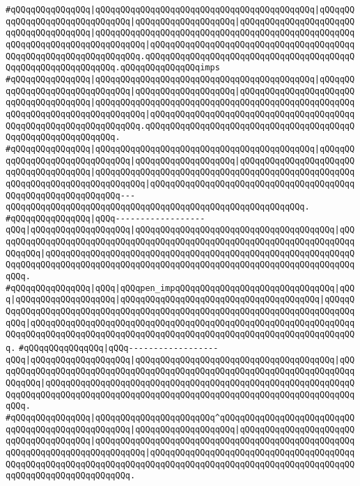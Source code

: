\verb|#qQQqqQQqqQQqqQQq|\verb#|qQQqqQQqqQQqqQQqqQQqqQQqqQQqqQQqqQQqqQQqqQQq|qQQqqQQqqQQqqQQqqQQqqQQqqQQqqQQq|qQQqqQQqqQQqqQQqqQQq|qQQqqQQqqQQqqQQqqQQqqQQqqQQqqQQqqQQqqQQq|qQQqqQQqqQQqqQQqqQQqqQQqqQQqqQQqqQQqqQQqqQQqqQQqqQQqqQQqqQQqqQQqqQQqqQQqqQQqqQQq|qQQqqQQqqQQqqQQqqQQqqQQqqQQqqQQqqQQqqQQqqQQqqQQqqQQqqQQqqQQqqQQqqQQq.qQQqqQQqqQQqqQQqqQQqqQQqqQQqqQQqqQQqqQQqqQQqqQQqqQQqqQQqqQQqqQQq.qQQqqQQqqQQqqQQqimps#\newline
\verb|#qQQqqQQqqQQqqQQq|\verb#|qQQqqQQqqQQqqQQqqQQqqQQqqQQqqQQqqQQqqQQqqQQq|qQQqqQQqqQQqqQQqqQQqqQQqqQQqqQQq|qQQqqQQqqQQqqQQqqQQq|qQQqqQQqqQQqqQQqqQQqqQQqqQQqqQQqqQQqqQQq|qQQqqQQqqQQqqQQqqQQqqQQqqQQqqQQqqQQqqQQqqQQqqQQqqQQqqQQqqQQqqQQqqQQqqQQqqQQqqQQq|qQQqqQQqqQQqqQQqqQQqqQQqqQQqqQQqqQQqqQQqqQQqqQQqqQQqqQQqqQQqqQQqqQQq.qQQqqQQqqQQqqQQqqQQqqQQqqQQqqQQqqQQqqQQqqQQqqQQqqQQqqQQqqQQqqQQq.#\newline
\verb|#qQQqqQQqqQQqqQQq|\verb#|qQQqqQQqqQQqqQQqqQQqqQQqqQQqqQQqqQQqqQQqqQQq|qQQqqQQqqQQqqQQqqQQqqQQqqQQqqQQq|qQQqqQQqqQQqqQQqqQQq|qQQqqQQqqQQqqQQqqQQqqQQqqQQqqQQqqQQqqQQq|qQQqqQQqqQQqqQQqqQQqqQQqqQQqqQQqqQQqqQQqqQQqqQQqqQQqqQQqqQQqqQQqqQQqqQQqqQQqqQQq|qQQqqQQqqQQqqQQqqQQqqQQqqQQqqQQqqQQqqQQqqQQqqQQqqQQqqQQqqQQqqQQq---qQQqqQQqqQQqqQQqqQQqqQQqqQQqqQQqqQQqqQQqqQQqqQQqqQQqqQQqqQQq.#\newline
\verb|#qQQqqQQqqQQqqQQq|\verb#|qQQq------------------qQQq|qQQqqQQqqQQqqQQqqQQq|qQQqqQQqqQQqqQQqqQQqqQQqqQQqqQQqqQQqqQQq|qQQqqQQqqQQqqQQqqQQqqQQqqQQqqQQqqQQqqQQqqQQqqQQqqQQqqQQqqQQqqQQqqQQqqQQqqQQqqQQq|qQQqqQQqqQQqqQQqqQQqqQQqqQQqqQQqqQQqqQQqqQQqqQQqqQQqqQQqqQQqqQQqqQQqqQQqqQQqqQQqqQQqqQQqqQQqqQQqqQQqqQQqqQQqqQQqqQQqqQQqqQQqqQQqqQQqqQQq.#\newline
\verb|#qQQqqQQqqQQqqQQq|\verb#|qQQq|qQQqpen_impqQQqqQQqqQQqqQQqqQQqqQQqqQQqqQQq|qQQq|qQQqqQQqqQQqqQQqqQQq|qQQqqQQqqQQqqQQqqQQqqQQqqQQqqQQqqQQqqQQq|qQQqqQQqqQQqqQQqqQQqqQQqqQQqqQQqqQQqqQQqqQQqqQQqqQQqqQQqqQQqqQQqqQQqqQQqqQQqqQQq|qQQqqQQqqQQqqQQqqQQqqQQqqQQqqQQqqQQqqQQqqQQqqQQqqQQqqQQqqQQqqQQqqQQqqQQqqQQqqQQqqQQqqQQqqQQqqQQqqQQqqQQqqQQqqQQqqQQqqQQqqQQqqQQqqQQqqQQq.#\newline
\verb|#qQQqqQQqqQQqqQQq|\verb#|qQQq------------------qQQq|qQQqqQQqqQQqqQQqqQQq|qQQqqQQqqQQqqQQqqQQqqQQqqQQqqQQqqQQqqQQq|qQQqqQQqqQQqqQQqqQQqqQQqqQQqqQQqqQQqqQQqqQQqqQQqqQQqqQQqqQQqqQQqqQQqqQQqqQQqqQQq|qQQqqQQqqQQqqQQqqQQqqQQqqQQqqQQqqQQqqQQqqQQqqQQqqQQqqQQqqQQqqQQqqQQqqQQqqQQqqQQqqQQqqQQqqQQqqQQqqQQqqQQqqQQqqQQqqQQqqQQqqQQqqQQqqQQqqQQq.#\newline
\verb|#qQQqqQQqqQQqqQQq|\verb#|qQQqqQQqqQQqqQQqqQQqqQQq^qQQqqQQqqQQqqQQqqQQqqQQqqQQqqQQqqQQqqQQqqQQqqQQqqQQq|qQQqqQQqqQQqqQQqqQQq|qQQqqQQqqQQqqQQqqQQqqQQqqQQqqQQqqQQqqQQq|qQQqqQQqqQQqqQQqqQQqqQQqqQQqqQQqqQQqqQQqqQQqqQQqqQQqqQQqqQQqqQQqqQQqqQQqqQQqqQQq|qQQqqQQqqQQqqQQqqQQqqQQqqQQqqQQqqQQqqQQqqQQqqQQqqQQqqQQqqQQqqQQqqQQqqQQqqQQqqQQqqQQqqQQqqQQqqQQqqQQqqQQqqQQqqQQqqQQqqQQqqQQqqQQqqQQqqQQq.#\newline
